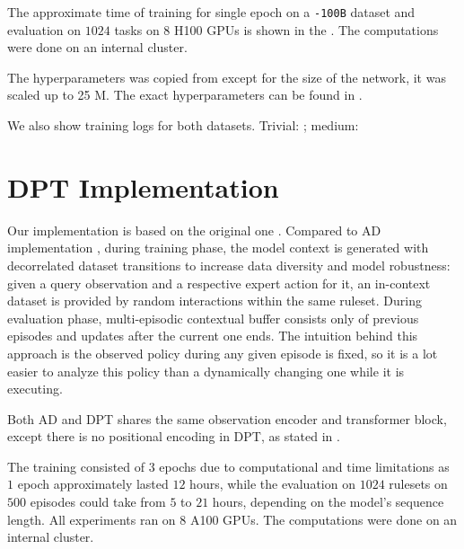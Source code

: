 \documentclass{article}
\begin{document}
The approximate time of training for single epoch on a \texttt{-100B} dataset and evaluation on $1024$ tasks on 8 H100 GPUs is shown in the . The computations were done on an internal cluster.

The hyperparameters was copied from \citep{laskin2022context} except for the size of the network, it was scaled up to 25 M. The exact hyperparameters can be found in .

We also show training logs for both datasets. Trivial: \href{https://wandb.ai/dunnolab/xminigrid-datasets?nw=96pyqrtxwuu}{\color{blue}{wandb}}; medium: \href{https://wandb.ai/dunnolab/xminigrid-datasets?nw=5u8wa1myqlw}{\color{blue}{wandb}}


\section{DPT Implementation}
\label{apndx:dpt}

Our implementation is based on the original one \citep{lee2023supervised}. Compared to AD implementation \citep{laskin2022context}, during training phase, the model context is generated with decorrelated dataset transitions to increase data diversity and model robustness: given a query observation and a respective expert action for it, an in-context dataset is provided by random interactions within the same ruleset. During evaluation phase, multi-episodic contextual buffer consists only of previous episodes and updates after the current one ends. The intuition behind this approach is the observed policy during any given episode is fixed, so it is a lot easier to analyze this policy than a dynamically changing one while it is executing.

Both AD and DPT shares the same observation encoder and transformer block, except there is no positional encoding in DPT, as stated in \citep{lee2023supervised}.

The training consisted of $3$ epochs due to computational and time limitations as $1$ epoch approximately lasted $12$ hours, while the evaluation on $1024$ rulesets on $500$ episodes could take from $5$ to $21$ hours, depending on the model's sequence length. All experiments ran on $8$ A100 GPUs. The computations were done on an internal cluster.
\end{document}
